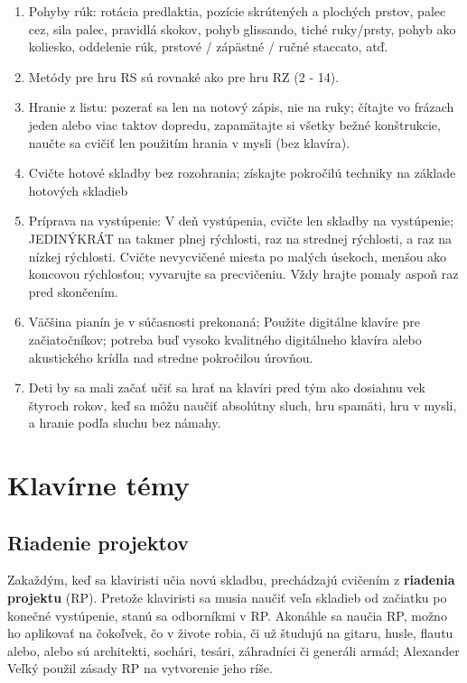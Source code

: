 \documentclass[11pt,a4paper]{book}
\begin{document}
\begin{enumerate}
\item Pohyby rúk: rotácia predlaktia, pozície skrútených a plochých prstov, palec cez, sila palec, 
pravidlá skokov, pohyb glissando, tiché ruky/prsty, pohyb ako koliesko, oddelenie rúk, prstové / zápästné / ručné staccato, atď.

\item Metódy pre hru RS sú rovnaké ako pre hru RZ (2 - 14).

\item Hranie z listu: pozerať sa len na notový zápis, nie na ruky; čítajte vo frázach jeden alebo viac taktov dopredu, zapamätajte si všetky bežné konštrukcie, naučte sa cvičiť len použitím hrania v mysli (bez klavíra).

\item Cvičte hotové skladby bez rozohrania; získajte pokročilú techniky na základe hotových skladieb

\item Príprava na vystúpenie: V deň vystúpenia, cvičte len skladby na vystúpenie; JEDINÝKRÁT na takmer plnej rýchlosti, raz na strednej rýchlosti, a raz na nízkej rýchlosti. Cvičte nevycvičené miesta po malých úsekoch, menšou ako koncovou rýchlosťou; vyvarujte sa precvičeniu. Vždy hrajte pomaly aspoň raz pred skončením.

\item Väčšina pianín je v súčasnosti prekonaná; Použite digitálne klavíre pre začiatočníkov; potreba buď vysoko kvalitného digitálneho klavíra alebo akustického krídla nad stredne pokročilou úrovňou.

\item Deti by sa mali začať učiť sa hrať na klavíri pred tým ako dosiahnu vek štyroch rokov, keď sa môžu naučiť absolútny sluch, hru spamäti, hru v mysli, a hranie podľa sluchu bez námahy.
\end{enumerate}

\chapter{Klavírne témy}\label{s:piano-topics}

\section{Riadenie projektov}\label{s:project-management}
Zakaždým, keď sa klaviristi učia novú skladbu, prechádzajú cvičením z \textbf{riadenia projektu} (RP). Pretože klaviristi sa musia naučiť veľa skladieb od začiatku po konečné vystúpenie, stanú sa odborníkmi v RP. Akonáhle sa naučia RP, možno ho aplikovať na čokoľvek, čo v živote robia, či už študujú na gitaru, husle, flautu alebo, alebo sú architekti, sochári, tesári, záhradníci či generáli armád; Alexander Veľký použil zásady RP na vytvorenie jeho ríše.
\end{document}
